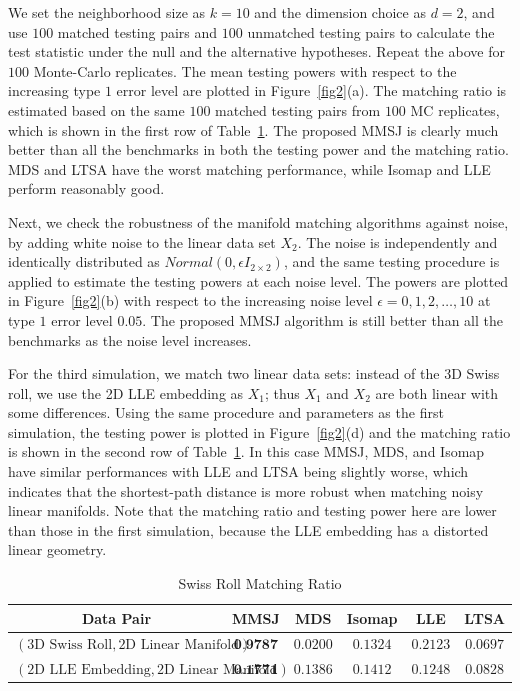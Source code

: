 \documentclass[times,twocolumn,final]{elsarticle}
\begin{document}
We set the neighborhood size as $k=10$ and the dimension choice as $d=2$, and use $100$ matched testing pairs and $100$ unmatched testing pairs to calculate the test statistic under the null and the alternative hypotheses. Repeat the above for $100$ Monte-Carlo replicates. The mean testing powers with respect to the increasing type $1$ error level are plotted in Figure~\ref{fig2}(a). The matching ratio is estimated based on the same $100$ matched testing pairs from $100$ MC replicates, which is shown in the first row of Table~\ref{table:Swiss}. The proposed MMSJ is clearly much better than all the benchmarks in both the testing power and the matching ratio. MDS and LTSA have the worst matching performance, while Isomap and LLE perform reasonably good.

Next, we check the robustness of the manifold matching algorithms against noise, by adding white noise to the linear data set $X_{2}$. The noise is independently and identically distributed as $Normal(0, \epsilon I_{2 \times 2})$, and the same testing procedure is applied to estimate the testing powers at each noise level. The powers are plotted in Figure~\ref{fig2}(b) with respect to the increasing noise level $\epsilon = 0,1,2,\ldots,10$ at type $1$ error level $0.05$. The proposed MMSJ algorithm is still better than all the benchmarks as the noise level increases.

For the third simulation, we match two linear data sets: instead of the 3D Swiss roll, we use the 2D LLE embedding as $X_{1}$; thus $X_{1}$ and $X_{2}$ are both linear with some differences. Using the same procedure and parameters as the first simulation, the testing power is plotted in Figure~\ref{fig2}(d) and the matching ratio is shown in the second row of Table~\ref{table:Swiss}. In this case MMSJ, MDS, and Isomap have similar performances with LLE and LTSA being slightly worse, which indicates that the shortest-path distance is more robust when matching noisy linear manifolds. Note that the matching ratio and testing power here are lower than those in the first simulation, because the LLE embedding has a distorted linear geometry. 

\begin{table}[htbp]
\centering
\caption{Swiss Roll Matching Ratio}
\label{table:Swiss}
\begin{tabular}{|c||c|c|c|c|c|}
\hline
Data Pair & MMSJ & MDS & Isomap & LLE & LTSA \\
\hline
$(\mbox{3D Swiss Roll}, \mbox{2D Linear Manifold})$ & $\textbf{0.9787}$  & $0.0200$ & $0.1324$ & $0.2123$ & $0.0697$\\
\hline
$(\mbox{2D LLE Embedding}, \mbox{2D Linear Manifold})$ & $\textbf{0.1771}$  & $0.1386$ & $0.1412$ & $0.1248$ & $0.0828$\\
\hline
\end{tabular}
\end{table}
\end{document}

